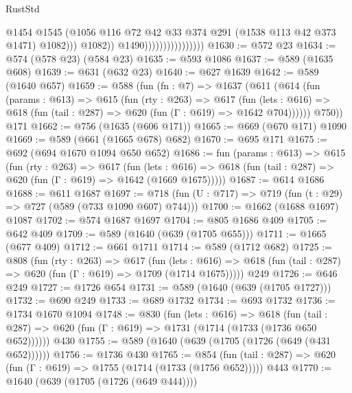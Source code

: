 \begin{lexlean}{RustStd}
\begin{coremodule}
                                            @1454
                                            @1545
                                            (@1056
                                              @116
                                              @72
                                              @42
                                              @33
                                              @374
                                              @291
                                              (@1538 @113 @42 @373 @1471)
                                              @1082)))
                                        @1082))
                                    @1490))))))))))))))))
@1630 := @572 @23
@1634 := @574 (@578 @23) (@584 @23)
@1635 := @593 @1086
@1637 := @589 (@1635 @608)
@1639 := @631 (@632 @23)
@1640 := @627 @1639
@1642 := @589 (@1640 @657)
@1659 := @588
    (fun (fn : @7) =>
    @1637
      (@611
        (@614
          (fun (params : @613) =>
          @615
            (fun (rty : @263) =>
            @617
              (fun (lets : @616) =>
              @618 (fun (tail : @287) => @620 (fun (Γ : @619) => @1642 @704))))))
        @750))
    @171
@1662 := @756 (@1635 (@606 @171))
@1665 := @669 (@670 @171) @1090
@1669 := @589 (@661 (@1665 @678) @682)
@1670 := @695 @171
@1675 := @692 (@694 @1670 @1094 @650 @652)
@1686 := fun (params : @613) =>
  @615
    (fun (rty : @263) =>
    @617
      (fun (lets : @616) =>
      @618 (fun (tail : @287) => @620 (fun (Γ : @619) => @1642 (@1669 @1675)))))
@1687 := @614 @1686
@1688 := @611 @1687
@1697 := @718 (fun (U : @717) => @719 (fun (t : @29) => @727 (@589 (@733 @1090 @607) @744)))
@1700 := @1662 (@1688 @1697) @1087
@1702 := @574 @1687 @1697
@1704 := @805 @1686 @409
@1705 := @642 @409
@1709 := @589 (@1640 (@639 (@1705 @655)))
@1711 := @1665 (@677 @409)
@1712 := @661 @1711
@1714 := @589 (@1712 @682)
@1725 := @808
    (fun (rty : @263) =>
    @617
      (fun (lets : @616) =>
      @618 (fun (tail : @287) => @620 (fun (Γ : @619) => @1709 (@1714 @1675)))))
    @249
@1726 := @646 @249
@1727 := @1726 @654
@1731 := @589 (@1640 (@639 (@1705 @1727)))
@1732 := @690 @249
@1733 := @689 @1732
@1734 := @693 @1732
@1736 := @1734 @1670 @1094
@1748 := @830
    (fun (lets : @616) =>
    @618 (fun (tail : @287) => @620 (fun (Γ : @619) => @1731 (@1714 (@1733 (@1736 @650 @652))))))
    @430
@1755 := @589 (@1640 (@639 (@1705 (@1726 (@649 (@431 @652))))))
@1756 := @1736 @430
@1765 := @854
    (fun (tail : @287) => @620 (fun (Γ : @619) => @1755 (@1714 (@1733 (@1756 @652)))))
    @443
@1770 := @1640 (@639 (@1705 (@1726 (@649 @444))))

\end{coremodule}
\end{lexlean}
